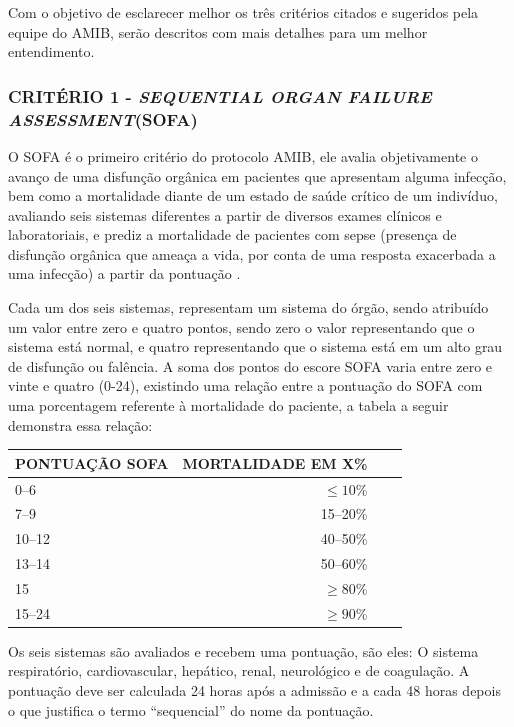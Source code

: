 \documentclass[12pt]{article}
\begin{document}
Com o objetivo de esclarecer melhor os três critérios citados e sugeridos pela equipe do AMIB, serão descritos com mais detalhes para um melhor entendimento.

\subsubsection{CRITÉRIO 1 - \textit{SEQUENTIAL ORGAN FAILURE ASSESSMENT}(SOFA)}

O SOFA é o primeiro critério do protocolo AMIB, ele avalia objetivamente o avanço de uma disfunção orgânica em pacientes que apresentam alguma infecção, bem como a mortalidade diante de um estado de saúde crítico de um indivíduo, avaliando seis sistemas diferentes a partir de diversos exames clínicos e laboratoriais, e prediz a mortalidade de pacientes com sepse (presença de disfunção orgânica que ameaça a vida, por conta de uma resposta exacerbada a uma infecção) a partir da pontuação \cite{lambden2019sofa}.

Cada um dos seis sistemas, representam um sistema do órgão, sendo atribuído um valor entre zero e quatro pontos, sendo zero o valor representando que o sistema está normal, e quatro representando que o sistema está em um alto grau de disfunção ou falência. A soma dos pontos do escore SOFA varia entre zero e vinte e quatro (0-24), existindo uma relação entre a pontuação do SOFA com uma porcentagem referente à mortalidade do paciente, a tabela a seguir demonstra essa relação:

\begin{center}
    \begin{tabular}{l r r r}
        \hline
        PONTUAÇÃO SOFA & MORTALIDADE EM X\% \\
        \hline
            0–6	& $\leq 10$\% \\
            7–9	& 15–20\% \\
            10–12 & 40–50\% \\
            13–14 & 50–60\% \\
            15 & $\geq80$\% \\
            15–24 & $\geq90$\% \\
        \hline
    \end{tabular}
\end{center}


Os seis sistemas são avaliados e recebem uma pontuação, são eles: O sistema respiratório, cardiovascular, hepático, renal, neurológico e de coagulação. A pontuação deve ser calculada 24 horas após a admissão e a cada 48 horas depois o que  justifica o termo “sequencial” do nome da pontuação.
\end{document}
